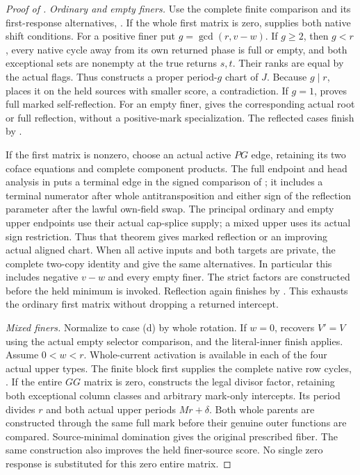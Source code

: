 \documentclass[11pt,a4paper]{amsart}
\numberwithin{equation}{section}
\theoremstyle{plain}
\theoremstyle{definition}
\begin{document}
\begin{proof}[Proof of ]
\smallskip\noindent\emph{Ordinary and empty finers.}
Use the complete finite comparison and its first-response alternatives,
.  If the whole first matrix
is zero,  supplies both native shift conditions.
For a positive finer put \(g=\gcd(r,v-w)\).
If \(g\ge2\), then \(g<r\), every native cycle away from its own
returned phase is full or empty, and both exceptional sets are
nonempty at the true returns \(s,t\).  Their ranks are equal by the
actual flags.  Thus \cite[Ordinary residue fold]{Shields2026Gluing}
constructs a proper period-\(g\) chart of \(J\).  Because \(g\mid r\),
 places it on the held sources with smaller
score, a contradiction.  If \(g=1\),
 proves full marked self-reflection.
For an empty finer,  gives the corresponding
actual root or full reflection, without a positive-mark specialization.
The reflected cases finish by .

If the first matrix is nonzero, choose an actual active \(PG\) edge,
retaining its two coface equations and complete component products.
The full endpoint and head analysis in
 puts a terminal edge in the signed
comparison of ; it includes a terminal
numerator after whole antitransposition and either sign of the
reflection parameter after the lawful own-field swap.  The principal
ordinary and empty upper endpoints use their actual cap-splice supply;
a mixed upper uses its actual sign restriction.  Thus that theorem
gives marked reflection or an improving actual aligned chart.
When all active inputs and both targets are private, the complete
two-copy identity  and
 give the same alternatives.  In particular
this includes negative \(v-w\) and every empty finer.
The strict factors are constructed before the held minimum is invoked.
Reflection again finishes by .  This exhausts the
ordinary first matrix without dropping a returned intercept.

\smallskip\noindent\emph{Mixed finers.}
Normalize to case (d) by whole rotation.  If \(w=0\),
 recovers \(V'=V\) using the actual empty
selector comparison, and the literal-inner finish applies.
Assume \(0<w<r\).  Whole-current activation is available in each
of the four actual upper types.  The finite block first supplies the
complete native row cycles, .
If the entire \(GG\) matrix is zero,
 constructs the legal
divisor factor, retaining both exceptional column classes and arbitrary
mark-only intercepts.  Its period divides \(r\) and both actual upper
periods \(Mr+\delta\).  Both whole parents are constructed through
the same full mark before their genuine outer functions are compared.
Source-minimal domination gives the original prescribed fiber.
The same construction also improves the held finer-source score.
No single zero response is substituted for this zero entire matrix.


\end{proof}
\end{document}
